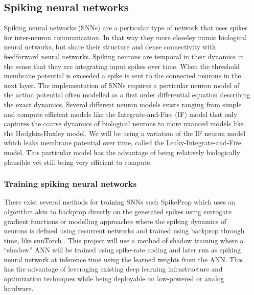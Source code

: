 \documentclass[a4paper,11pt]{article} %
\begin{document}
\newpage





\subsection{Spiking neural networks}
Spiking neural networks (SNNs) are a perticular type of network that uses spikes for inter-neuron communication. In that way they more closeley mimic biological neural networks, but share their structure and dense connectivity with feedforward neural networks. Spiking neurons are temporal in their dynamics in the sense that they are integrating input spikes over time. When the threshold membrane potential is exceeded a spike is sent to the connected neurons in the next layer. The implementation of SNNs requires a perticular neuron model of the action potential often modelled as a first order differential equation describing the exact dynamics. Several different neuron models exists ranging from simple and compute efficient models like the Integrate-and-Fire (IF) model that only captures the coarse dynamics of biological neurons to more nuanced models like the Hodgkin-Huxley model. We will be using a variation of the IF neuron model which leaks membrane potential over time, called the Leaky-Integrate-and-Fire model. This particular model has the advantage of being relatively biologically plausible yet still being very efficient to compute. 

\subsubsection{Training spiking neural networks}
There exist several methods for training SNNs such SpikeProp \cite{Boht2000SpikePropBF} which uses an algorithm akin to backprop directly on the generated spikes using surrogate gradient functions or modelling approaches where the spiking dynamics of neurons is defined using recurrent networks and trained using backprop through time, like snnTorch \cite{eshraghian2021training}. This project will use a method of shadow training where a ``shadow'' ANN will be trained using spike-rate coding and later run as spiking neural network at inference time using the learned weights from the ANN. This has the advantage of leveraging existing deep learning infrastructure and optimization techniques while being deployable on low-powered or analog hardware. 
\end{document}
